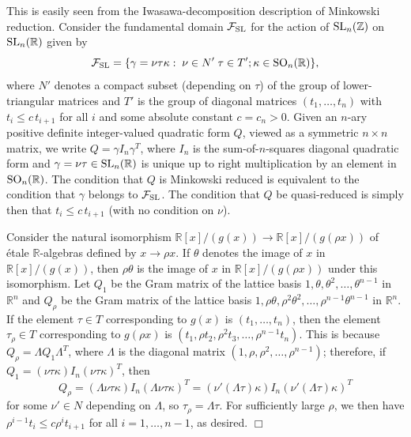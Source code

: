 \documentclass[11pt]{article}
\def\Z{{\mathbb Z}}
\def\SL{{\rm SL}}
\def\SO{{\rm SO}}
\def\R{{\mathbb R}}
\def\FF{{\mathcal F}}
\def\Z{{\mathbb Z}}
\newenvironment{proof}{\noindent {\bf Proof:}}{$\Box$ \vspace{2 ex}}
\begin{document}
\begin{proof}
This is easily seen from the Iwasawa-decomposition description of
Minkowski reduction. Consider the fundamental domain $\FF_\SL$ for
the action of $\SL_n(\Z)$ on $\SL_n(\R)$ given by
\begin{equation*}
\FF_\SL=\{\gamma=\nu \tau \kappa:\;\nu\in N'\;\tau\in T';\kappa\in\SO_n(\R)\},
\end{equation*}
where $N'$ denotes a compact subset (depending on $\tau$) of the group
of lower-triangular matrices and $T'$ is the group of diagonal
matrices $(t_1,\ldots,t_n)$ with $t_i\leq c\,t_{i+1}$ for all $i$ and
some absolute constant $c=c_n>0$.  Given an $n$-ary positive definite
integer-valued quadratic form $Q$, viewed as a symmetric $n\times n$
matrix, we write $Q=\gamma I_n \gamma^T$, where $I_n$ is the
sum-of-$n$-squares diagonal quadratic form and
$\gamma=\nu\tau\in\SL_n(\R)$ is unique up to right multiplication by
an element in $\SO_n(\R)$. The condition that $Q$ is Minkowski reduced
is equivalent to the condition that $\gamma$ belongs to $\FF_\SL$.
The condition that $Q$ be quasi-reduced is simply then that $t_i\leq
c\,t_{i+1}$ (with no condition on $\nu$).



Consider the natural isomorphism $\R[x]/(g(x))\to \R[x]/(g(\rho x))$
of \'etale $\R$-algebras defined by $x\to\rho x$.  If $\theta$ denotes
the image of $x$ in $\R[x]/(g(x))$, then $\rho\theta$ is the image of
$x$ in $\R[x]/(g(\rho x))$ under this isomorphism.
Let $Q_1$ be the Gram matrix of the lattice basis
$1,\theta,\theta^2,\ldots,\theta^{n-1}$ in
$\R^{n}$ and $Q_\rho$ be the Gram matrix of the lattice basis
$1,\rho\theta,\rho^2\theta^2,\ldots,\rho^{n-1}\theta^{n-1}$ in
$\R^{n}$.  If the element $\tau \in T$
corresponding to $g(x)$ is $(t_1,\ldots,t_n)$, then the element
$\tau_\rho\in T$ corresponding to $g(\rho x)$ is $(t_1,\rho t_2,\rho^2
t_3,\ldots,\rho^{n-1}t_n)$. This is because $Q_\rho=\Lambda
Q_1\Lambda^T$, where $\Lambda$ is the diagonal matrix
$(1,\rho,\rho^2,\ldots,\rho^{n-1})$; therefore, if
$Q_1=(\nu\tau\kappa)I_n(\nu\tau\kappa)^T$, then $$Q_\rho=
(\Lambda\nu\tau\kappa)I_n(\Lambda\nu\tau\kappa)^T=(\nu'(\Lambda\tau)\kappa)I_n(\nu'(\Lambda\tau)\kappa)^T$$
for some $\nu'\in N$ depending on $\Lambda$, so
$\tau_\rho=\Lambda\tau$. For sufficiently large $\rho$, we then have
$\rho^{i-1}t_i\leq c\rho^{i}t_{i+1}$ for all $i=1,\ldots,n-1$, as
desired.
 \end{proof}
\end{document}
